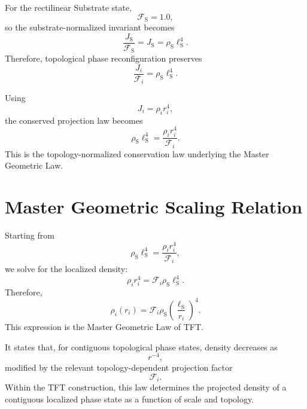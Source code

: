 For the rectilinear Substrate state,
\begin{equation}
    \mathcal{F}_{\mathrm{S}} = 1.0,
\end{equation}
so the substrate-normalized invariant becomes
\begin{equation}
    \frac{J_{\mathrm{S}}}{\mathcal{F}_{\mathrm{S}}} = J_{\mathrm{S}} = \rho_{\mathrm{S}}\ell_{\mathrm{S}}^4.
\end{equation}
Therefore, topological phase reconfiguration preserves
\begin{equation}
    \frac{J_i}{\mathcal{F}_i} = \rho_{\mathrm{S}}\ell_{\mathrm{S}}^4.
\end{equation}

Using
\begin{equation}
    J_i = \rho_i r_i^4,
\end{equation}
the conserved projection law becomes
\begin{equation}
    \rho_{\mathrm{S}}\ell_{\mathrm{S}}^4 = \frac{\rho_i r_i^4}{\mathcal{F}_i}.
\end{equation}
This is the topology-normalized conservation law underlying the Master Geometric Law.

\section{Master Geometric Scaling Relation}
Starting from
\begin{equation}
    \rho_{\mathrm{S}}\ell_{\mathrm{S}}^4 = \frac{\rho_i r_i^4}{\mathcal{F}_i},
\end{equation}
we solve for the localized density:
\begin{equation}
    \rho_i r_i^4 = \mathcal{F}_i\rho_{\mathrm{S}}\ell_{\mathrm{S}}^4.
\end{equation}
Therefore,
\begin{equation}
    \rho_i(r_i) = \mathcal{F}_i\rho_{\mathrm{S}} \left( \frac{\ell_{\mathrm{S}}}{r_i} \right)^4.
\end{equation}
This expression is the Master Geometric Law of TFT.

It states that, for contiguous topological phase states, density decreases as
\begin{equation}
    r^{-4},
\end{equation}
modified by the relevant topology-dependent projection factor
\begin{equation}
    \mathcal{F}_i.
\end{equation}
Within the TFT construction, this law determines the projected density of a contiguous localized phase state as a function of scale and topology.

